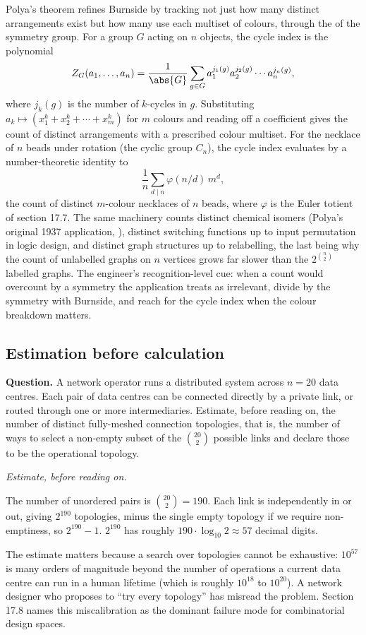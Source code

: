 \begin{mastery}
Polya's theorem refines Burnside by tracking not just how many
distinct arrangements exist but how many use each multiset of
colours, through the  of the symmetry group. For
a group $G$ acting on $n$ objects, the cycle index is the polynomial
\[
Z_{G}(a_{1}, \ldots, a_{n}) = \frac{1}{\abs{G}}
\sum_{g \in G} a_{1}^{j_{1}(g)} a_{2}^{j_{2}(g)} \cdots
a_{n}^{j_{n}(g)},
\]
where $j_{k}(g)$ is the number of $k$-cycles in $g$. Substituting
$a_{k} \mapsto (x_{1}^{k} + x_{2}^{k} + \cdots + x_{m}^{k})$ for $m$
colours and reading off a coefficient gives the count of distinct
arrangements with a prescribed colour multiset. For the necklace of
$n$ beads under rotation (the cyclic group $C_{n}$), the cycle index
evaluates by a number-theoretic identity to
\[
\frac{1}{n} \sum_{d \mid n} \varphi(n / d)\, m^{d},
\]
the count of distinct $m$-colour necklaces of $n$ beads, where
$\varphi$ is the Euler totient of section 17.7. The same machinery
counts distinct chemical isomers (Polya's original 1937 application,
\cite{gen:polya1945}), distinct switching functions up to input
permutation in logic design, and distinct graph structures up to
relabelling, the last being why the count of unlabelled graphs on
$n$ vertices grows far slower than the $2^{\binom{n}{2}}$ labelled
graphs. The engineer's recognition-level cue: when a count would
overcount by a symmetry the application treats as irrelevant, divide
by the symmetry with Burnside, and reach for the cycle index when the
colour breakdown matters.
\end{mastery}

\subsection{Estimation before calculation}

\begin{estimation}
\textbf{Question.} A network operator runs a distributed system
across $n = 20$ data centres. Each pair of data centres can be
connected directly by a private link, or routed through one or more
intermediaries. Estimate, before reading on, the number of distinct
fully-meshed connection topologies, that is, the number of ways to
select a non-empty subset of the $\binom{20}{2}$ possible links and
declare those to be the operational topology.

\smallskip
\textit{Estimate, before reading on.}

\smallskip
The number of unordered pairs is $\binom{20}{2} = 190$. Each link
is independently in or out, giving $2^{190}$ topologies, minus the
single empty topology if we require non-emptiness, so $2^{190} - 1$.
$2^{190}$ has roughly $190 \cdot \log_{10} 2 \approx 57$ decimal
digits.

The estimate matters because a search over topologies cannot be
exhaustive: $10^{57}$ is many orders of magnitude beyond the number
of operations a current data centre can run in a human lifetime
(which is roughly $10^{18}$ to $10^{20}$). A network designer who
proposes to ``try every topology'' has misread the problem. Section
17.8 names this miscalibration as the dominant failure mode for
combinatorial design spaces.
\end{estimation}

